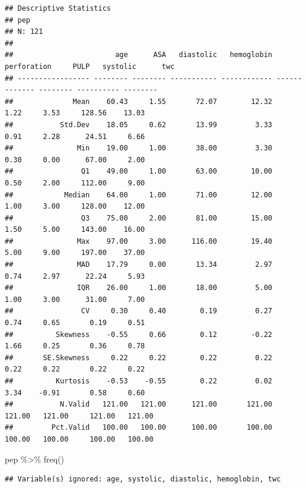 \documentclass[
  10pt,
]{krantz}
\newenvironment{Shaded}{\begin{snugshade}}{\end{snugshade}}
\newcommand{\FunctionTok}[1]{\textcolor[rgb]{0.00,0.00,0.00}{#1}}
\newcommand{\NormalTok}[1]{#1}
\newcommand{\SpecialCharTok}[1]{\textcolor[rgb]{0.00,0.00,0.00}{#1}}
\begin{document}
\begin{verbatim}
## Descriptive Statistics  
## pep  
## N: 121  
## 
##                        age      ASA   diastolic   hemoglobin   perforation     PULP   systolic      twc
## ----------------- -------- -------- ----------- ------------ ------------- -------- ---------- --------
##              Mean    60.43     1.55       72.07        12.32          1.22     3.53     128.56    13.03
##           Std.Dev    18.05     0.62       13.99         3.33          0.91     2.28      24.51     6.66
##               Min    19.00     1.00       38.00         3.30          0.30     0.00      67.00     2.00
##                Q1    49.00     1.00       63.00        10.00          0.50     2.00     112.00     9.00
##            Median    64.00     1.00       71.00        12.00          1.00     3.00     128.00    12.00
##                Q3    75.00     2.00       81.00        15.00          1.50     5.00     143.00    16.00
##               Max    97.00     3.00      116.00        19.40          5.00     9.00     197.00    37.00
##               MAD    17.79     0.00       13.34         2.97          0.74     2.97      22.24     5.93
##               IQR    26.00     1.00       18.00         5.00          1.00     3.00      31.00     7.00
##                CV     0.30     0.40        0.19         0.27          0.74     0.65       0.19     0.51
##          Skewness    -0.55     0.66        0.12        -0.22          1.66     0.25       0.36     0.78
##       SE.Skewness     0.22     0.22        0.22         0.22          0.22     0.22       0.22     0.22
##          Kurtosis    -0.53    -0.55        0.22         0.02          3.34    -0.91       0.58     0.60
##           N.Valid   121.00   121.00      121.00       121.00        121.00   121.00     121.00   121.00
##         Pct.Valid   100.00   100.00      100.00       100.00        100.00   100.00     100.00   100.00
\end{verbatim}

\begin{Shaded}
\begin{Highlighting}[]
\NormalTok{pep }\SpecialCharTok{\%\textgreater{}\%} \FunctionTok{freq}\NormalTok{()}
\end{Highlighting}
\end{Shaded}

\begin{verbatim}
## Variable(s) ignored: age, systolic, diastolic, hemoglobin, twc
\end{verbatim}
\end{document}
